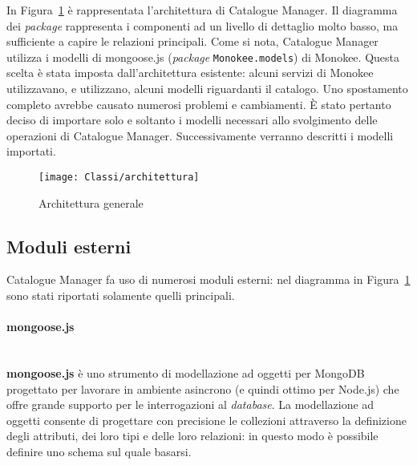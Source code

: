 In Figura~\ref{fig:architetturaGenerale} è rappresentata l'architettura di Catalogue Manager. Il diagramma dei \textit{package} rappresenta i componenti ad un livello di dettaglio molto basso, ma sufficiente a capire le relazioni principali. Come si nota, Catalogue Manager utilizza i modelli di mongoose.js (\textit{package} \texttt{Monokee.models}) di Monokee. Questa scelta è stata imposta dall'architettura esistente: alcuni servizi di Monokee utilizzavano, e utilizzano, alcuni modelli riguardanti il catalogo. Uno spostamento completo avrebbe causato numerosi problemi e cambiamenti. È stato pertanto deciso di importare solo e soltanto i modelli necessari allo svolgimento delle operazioni di Catalogue Manager. Successivamente verranno descritti i modelli importati.

\begin{figure}[hbpc]
  \begin{center}
    \texttt{[image: Classi/architettura]}
  \caption[Architettura generale]{Architettura generale}
  \label{fig:architetturaGenerale}
  \end{center} 
\end{figure}

\subsection{Moduli esterni}
Catalogue Manager fa uso di numerosi moduli esterni: nel diagramma in Figura~\ref{fig:architetturaGenerale} sono stati riportati solamente quelli principali.

\paragraph{mongoose.js} \mbox{} \\
\textbf{mongoose.js} è uno strumento di modellazione ad oggetti per MongoDB progettato per lavorare in ambiente asincrono (e quindi ottimo per Node.js) che offre grande supporto per le interrogazioni al \textit{database}. La modellazione ad oggetti consente di progettare con precisione le collezioni attraverso la definizione degli attributi, dei loro tipi e delle loro relazioni: in questo modo è possibile definire uno schema sul quale basarsi. 

